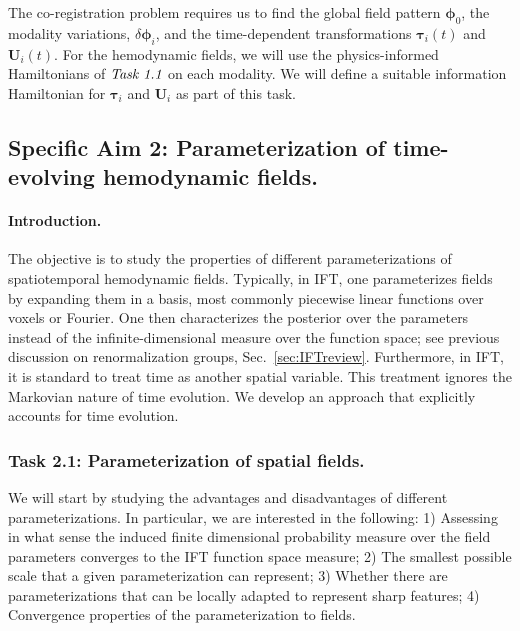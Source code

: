 The co-registration problem requires us to find the global field pattern $\boldsymbol{\phi}_0$, the modality variations, $\delta \boldsymbol{\phi}_i$, and the time-dependent transformations $\boldsymbol{\tau}_i(t)$ and $\mathbf{U}_i(t)$.
For the hemodynamic fields, we will use the physics-informed Hamiltonians of $\emph{Task 1.1}$ on each modality.
We will define a suitable information Hamiltonian for $\boldsymbol{\tau}_i$ and $\mathbf{U}_i$ as part of this task.

\subsection*{Specific Aim 2: Parameterization of time-evolving hemodynamic fields.}

\paragraph{Introduction.}
The objective is to study the properties of different parameterizations of spatiotemporal hemodynamic fields. Typically, in IFT, one parameterizes fields by expanding them in a basis, most commonly piecewise linear functions over voxels or Fourier. One then characterizes the posterior over the parameters instead of the infinite-dimensional measure over the function space; see previous discussion on renormalization groups, Sec.~\ref{sec:IFTreview}. 
Furthermore, in IFT, it is standard to treat time as another spatial variable.
This treatment ignores the Markovian nature of time evolution.
We develop an approach that explicitly accounts for time evolution.

\subsubsection*{Task 2.1: Parameterization of spatial fields.}
We will start by studying the advantages and disadvantages of different parameterizations.
In particular, we are interested in the following: 
1) Assessing in what sense the induced finite dimensional probability measure over the field parameters converges to the IFT function space measure;
2) The smallest possible scale that a given parameterization can represent;
3) Whether there are parameterizations that can be locally adapted to represent sharp features;
4) Convergence properties of the parameterization to fields.

